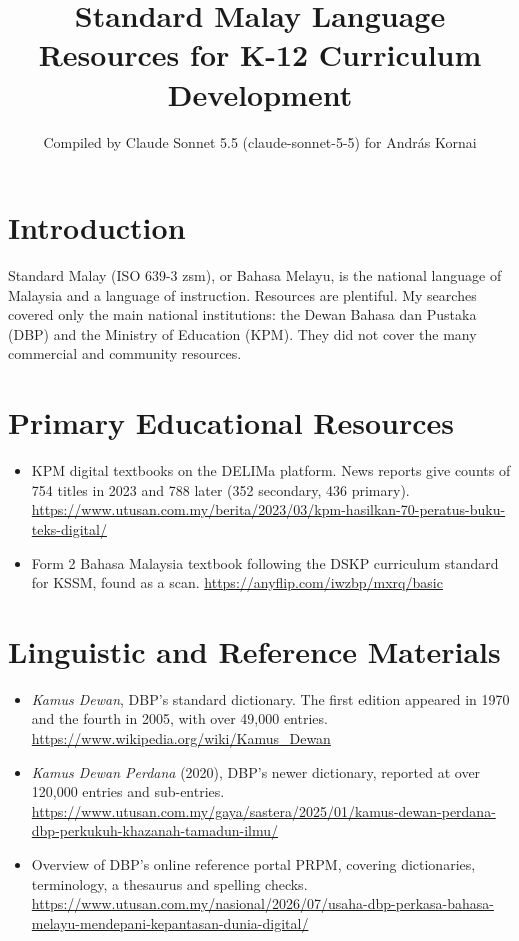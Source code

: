 \documentclass[12pt]{article}
\title{Standard Malay Language Resources for K-12 Curriculum Development}
\author{Compiled by Claude Sonnet 5.5 (claude-sonnet-5-5) for Andr\'as Kornai}
\date{}
\begin{document}
\maketitle

\section{Introduction}
Standard Malay (ISO 639-3 zsm), or Bahasa Melayu, is the national language of Malaysia and a language of instruction. Resources are plentiful. My searches covered only the main national institutions: the Dewan Bahasa dan Pustaka (DBP) and the Ministry of Education (KPM). They did not cover the many commercial and community resources.

\section{Primary Educational Resources}
\begin{itemize}
\item KPM digital textbooks on the DELIMa platform. News reports give counts of 754 titles in 2023 and 788 later (352 secondary, 436 primary). \url{https://www.utusan.com.my/berita/2023/03/kpm-hasilkan-70-peratus-buku-teks-digital/}
\item Form 2 Bahasa Malaysia textbook following the DSKP curriculum standard for KSSM, found as a scan. \url{https://anyflip.com/iwzbp/mxrq/basic}
\end{itemize}

\section{Linguistic and Reference Materials}
\begin{itemize}
\item \emph{Kamus Dewan}, DBP's standard dictionary. The first edition appeared in 1970 and the fourth in 2005, with over 49,000 entries. \url{https://www.wikipedia.org/wiki/Kamus_Dewan}
\item \emph{Kamus Dewan Perdana} (2020), DBP's newer dictionary, reported at over 120,000 entries and sub-entries. \url{https://www.utusan.com.my/gaya/sastera/2025/01/kamus-dewan-perdana-dbp-perkukuh-khazanah-tamadun-ilmu/}
\item Overview of DBP's online reference portal PRPM, covering dictionaries, terminology, a thesaurus and spelling checks. \url{https://www.utusan.com.my/nasional/2026/07/usaha-dbp-perkasa-bahasa-melayu-mendepani-kepantasan-dunia-digital/}
\end{itemize}
\end{document}
